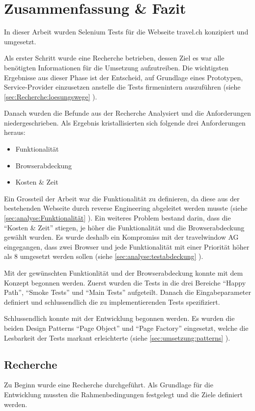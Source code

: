 
\chapter{Zusammenfassung \& Fazit}
In dieser Arbeit wurden Selenium Tests für die Webseite travel.ch konzipiert und umgesetzt. 

Als erster Schritt wurde eine Recherche betrieben, dessen Ziel es war alle benötigten Informationen für die Umsetzung aufzutreiben. Die wichtigsten Ergebnisse aus dieser Phase ist der Entscheid, auf Grundlage eines Prototypen, Service-Provider einzusetzen anstelle die Tests firmenintern auszuführen (siehe \cref{sec:Recherche:loesungswege} ). 

Danach wurden die Befunde aus der Recherche Analysiert und die Anforderungen niedergeschrieben. Als Ergebnis kristallisierten sich folgende drei Anforderungen heraus:
\begin{itemize}
\item Funktionalität
\item Browserabdeckung
\item Kosten \& Zeit
\end{itemize}
Ein Grossteil der Arbeit war die Funktionalität zu definieren, da diese aus der bestehenden Webseite durch reverse Engineering abgeleitet werden musste (siehe \cref{sec:analyse:Funktionalität} ). Ein weiteres Problem bestand darin, dass die "`Kosten \& Zeit"' stiegen, je höher die Funktionalität und die Browserabdeckung gewählt wurden. Es wurde deshalb ein Kompromiss mit der travelwindow AG eingegangen, dass zwei Browser und jede Funktionalität mit einer Priorität höher als 8 umgesetzt werden sollen (siehe  \cref{sec:analyse:testabdeckung} ).

Mit der gewünschten Funktionlität und der Browserabdeckung konnte mit dem Konzept begonnen werden. Zuerst wurden die Tests in die drei Bereiche "`Happy Path"', "`Smoke Tests"' und "`Main Tests"' aufgeteilt. Danach die Eingabeparameter definiert und schlussendlich die zu implementierenden Tests spezifiziert.

Schlussendlich konnte mit der Entwicklung begonnen werden. Es wurden die beiden Design Patterns "`Page Object"' und "`Page Factory"' eingesetzt, welche die Lesbarkeit der Tests markant erleichterte (siehe \cref{sec:umsetzung:patterns} ).

\section{Recherche}
Zu Beginn wurde eine Recherche durchgeführt. Als Grundlage für die Entwicklung mussten die Rahmenbedingungen festgelegt und die Ziele definiert werden.

